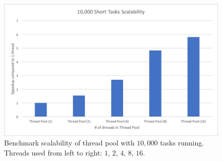 \documentclass[journal, a4paper]{IEEEtran}
\begin{document}
\begin{figure}[!hbt]
		\begin{center}
		\includegraphics[width=\columnwidth]{test_3.png}
		\caption{Benchmark scalability of thread pool with $10,000$ tasks running. Threads used from left to right: $1$, $2$, $4$, $8$, $16$.}
		\label{fig:tf_plot}
		\end{center}
	\end{figure}
\end{document}
